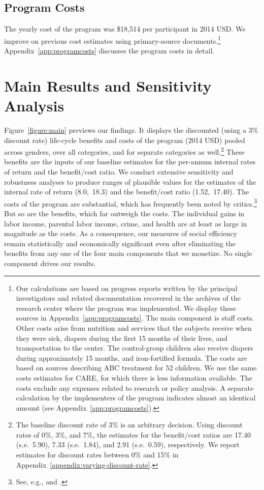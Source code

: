 \subsection{Program Costs} \label{section:programscosts}

The yearly cost of the program was \$18,514 per participant in 2014 USD. We improve on previous cost estimates using primary-source documents.\footnote{Our calculations are based on progress reports written by the principal investigators and related documentation recovered in the archives of the research center where the program was implemented. We display these sources in Appendix~\ref{app:programcosts}. The main component is staff costs. Other costs arise from nutrition and services that the subjects receive when they were sick, diapers during the first 15 months of their lives, and transportation to the center. The control-group children also receive diapers during approximately 15 months, and iron-fortified formula. The costs are based on sources describing ABC treatment for $52$ children. We use the same costs estimates for CARE, for which there is less information available. The costs exclude any expenses related to research or policy analysis. A separate calculation by the implementers of the program indicates almost an identical amount (see  Appendix~\ref{app:programcosts}).} Appendix~\ref{app:programcosts} discusses the program costs in detail.

\section{Main Results and Sensitivity Analysis} \label{section:cbaresults}

Figure~\ref{figure:main} previews our findings. It displays the discounted (using a 3\% discount rate) life-cycle benefits and costs of the program (2014 USD) pooled across genders, over all categories, and for separate categories as well.\footnote{The baseline discount rate of 3\% is an arbitrary decision. Using discount rates of 0\%, 3\%, and 7\%, the estimates for the benefit/cost ratios are 17.40 (s.e.\ 5.90), 7.33 (s.e.\ 1.84), and 2.91 (s.e.\ 0.59), respectively. We report estimates for discount rates between 0\% and 15\% in  Appendix~\ref{appendix:varying-discount-rate}.} These benefits are the inputs of our baseline estimates for the per-annum internal rates of return and the benefit/cost ratio. We conduct extensive sensitivity and robustness analyses to produce ranges of plausible values for the estimates of the internal rate of return (8.0,\ 18.3) and the benefit/cost ratio (1.52,\ 17.40). The costs of the program are substantial, which has frequently been noted by critics.\footnote{See, e.g., \citet{Fox_News_2014_Head_Start_Effects} and \citet{Whitehurst_2014_Senate_Testimony}.} But so are the benefits, which far outweigh the costs. The individual gains in labor income, parental labor income, crime, and health are at least as large in magnitude as the costs. As a consequence, our measures of social efficiency remain statistically and economically significant even after eliminating the benefits from any one of the four main components that we monetize. No single component drives our results.

